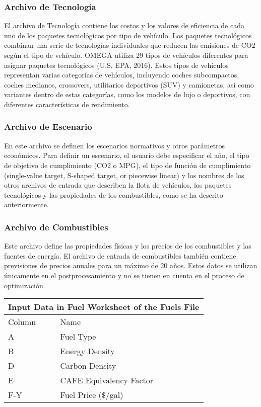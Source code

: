 \subsubsection{Archivo de Tecnología}

El archivo de Tecnología contiene los costos y los valores de eficiencia de cada uno de los paquetes tecnológicos por tipo de vehículo. Los paquetes tecnológicos combinan una serie de tecnologías individuales que reducen las emisiones de CO2 según el tipo de vehículo. OMEGA utiliza 29 tipos de vehículos diferentes para asignar paquetes tecnológicos (U.S. EPA, 2016). \cite{EPA_2016-B} Estos tipos de vehículos representan varias categorías de vehículos, incluyendo coches subcompactos, coches medianos, crossovers, utilitarios deportivos (SUV) y camionetas, así como variantes dentro de estas categorías, como los modelos de lujo o deportivos, con diferentes características de rendimiento. \cite{OMEGA_Mexico}

\subsubsection{Archivo de Escenario}

En este archivo se definen los escenarios normativos y otros parámetros económicos. Para definir un escenario, el usuario debe especificar el año, el tipo de objetivo de cumplimiento (CO2 o MPG), el tipo de función de cumplimiento (single-value target, S-shaped target, or piecewise linear) y los nombres de los otros archivos de entrada que describen la flota de vehículos, los paquetes tecnológicos y las propiedades de los combustibles, como se ha descrito anteriormente.

\subsubsection{Archivo de Combustibles}

Este archivo define las propiedades físicas y los precios de los combustibles y las fuentes de energía. El archivo de entrada de combustibles también contiene previsiones de precios anuales para un máximo de 20 años. Estos datos se utilizan únicamente en el postprocesamiento y no se tienen en cuenta en el proceso de optimización.

\begin{center}
\begin{tabular}{ |p{2cm}||p{6cm}|}
 \hline
 \multicolumn{2}{|c|}{Input Data in Fuel Worksheet of the Fuels File} \\
 \hline
 Column & Name\\
 \hline
    A & Fuel Type \\
    B & Energy Density \\
    D & Carbon Density  \\
    E & CAFE Equivalency Factor \\
    F-Y & Fuel Price (\$/gal) \\
 \hline
\end{tabular}
\end{center}

